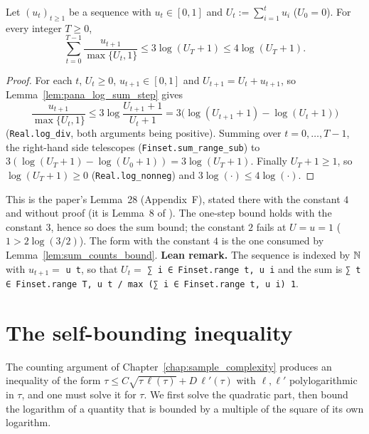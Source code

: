 \begin{lemma}\label{lem:log_sum_bound}
\leanok
Let $(u_t)_{t \ge 1}$ be a sequence with $u_t \in [0, 1]$ and $U_t := \sum_{i = 1}^t u_i$
($U_0 = 0$). For every integer $T \ge 0$,
\[
  \sum_{t = 0}^{T - 1}\frac{u_{t + 1}}{\max\{U_t, 1\}} \le 3\log(U_{T} + 1) \le 4\log(U_{T} + 1) .
\]
\end{lemma}

\begin{proof}
\leanok
For each $t$, $U_t \ge 0$, $u_{t+1} \in [0,1]$ and $U_{t+1} = U_t + u_{t+1}$, so
Lemma~\ref{lem:pana_log_sum_step} gives
\[
  \frac{u_{t + 1}}{\max\{U_t, 1\}} \le 3\log\frac{U_{t+1} + 1}{U_t + 1}
  = 3\big(\log(U_{t+1} + 1) - \log(U_t + 1)\big)
\]
(\texttt{Real.log\_div}, both arguments being positive). Summing over $t = 0, \dots, T - 1$, the
right-hand side telescopes (\texttt{Finset.sum\_range\_sub}) to
$3(\log(U_{T} + 1) - \log(U_0 + 1)) = 3\log(U_{T} + 1)$. Finally $U_{T} + 1 \ge 1$, so
$\log(U_{T} + 1) \ge 0$ (\texttt{Real.log\_nonneg}) and $3\log(\cdot) \le 4\log(\cdot)$.
\end{proof}

\begin{remark}\label{rem:pana_log_sum_const}
This is the paper's Lemma~28 (Appendix~F), stated there with the constant $4$ and without
proof (it is Lemma~8 of \cite{menard2021fast}). The one-step bound holds with the constant
$3$, hence so does the sum bound; the constant $2$ fails at $U = u = 1$ ($1 > 2\log(3/2)$).
The form with the constant $4$ is the one consumed by
Lemma~\ref{lem:sum_counts_bound}. \textbf{Lean remark.} The sequence is indexed by $\mathbb{N}$ with
$u_{t+1} = $ \texttt{u t}, so that $U_t = $ \texttt{∑ i ∈ Finset.range t, u i} and the sum is
\texttt{∑ t ∈ Finset.range T, u t / max (∑ i ∈ Finset.range t, u i) 1}.
\end{remark}

\section{The self-bounding inequality}
\label{sec:pre_analysis_self_bounding}

The counting argument of Chapter~\ref{chap:sample_complexity} produces an inequality of the
form $\tau \le C\sqrt{\tau\,\ell(\tau)} + D\,\ell'(\tau)$ with $\ell, \ell'$ polylogarithmic in
$\tau$, and one must solve it for $\tau$. We first solve the quadratic part, then bound the
logarithm of a quantity that is bounded by a multiple of the square of its own logarithm.

